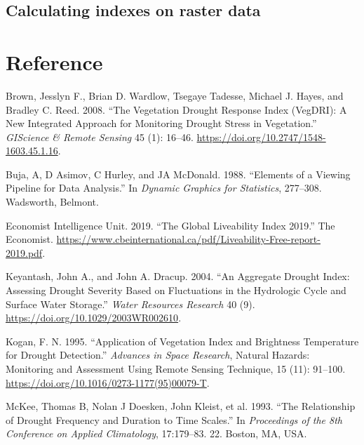 \documentclass[
]{article}
\newlength{\cslhangindent}
\newlength{\cslentryspacingunit} %
\newenvironment{CSLReferences}[2] %
 {%
  \setlength{\parindent}{0pt}
  \ifodd #1
  \let\oldpar\par
  \def\par{\hangindent=\cslhangindent\oldpar}
  \fi
  \setlength{\parskip}{#2\cslentryspacingunit}
 }%
 {}
\begin{document}
\newpage

\hypertarget{calculating-indexes-on-raster-data}{%
\subsection{Calculating indexes on raster
data}\label{calculating-indexes-on-raster-data}}

\hypertarget{reference}{%
\section*{Reference}\label{reference}}

\hypertarget{refs}{}
\begin{CSLReferences}{1}{0}
\leavevmode{}%
Brown, Jesslyn F., Brian D. Wardlow, Tsegaye Tadesse, Michael J. Hayes,
and Bradley C. Reed. 2008. {``The {Vegetation} {Drought} {Response}
{Index} ({VegDRI}): {A} {New} {Integrated} {Approach} for {Monitoring}
{Drought} {Stress} in {Vegetation}.''} \emph{GIScience \& Remote
Sensing} 45 (1): 16--46.
\url{https://doi.org/10.2747/1548-1603.45.1.16}.

\leavevmode{}%
Buja, A, D Asimov, C Hurley, and JA McDonald. 1988. {``Elements of a
Viewing Pipeline for Data Analysis.''} In \emph{Dynamic Graphics for
Statistics}, 277--308. Wadsworth, Belmont.

\leavevmode{}%
Economist Intelligence Unit. 2019. {``The Global Liveability Index
2019.''} The Economist.
\url{https://www.cbeinternational.ca/pdf/Liveability-Free-report-2019.pdf}.

\leavevmode{}%
Keyantash, John A., and John A. Dracup. 2004. {``An Aggregate Drought
Index: {Assessing} Drought Severity Based on Fluctuations in the
Hydrologic Cycle and Surface Water Storage.''} \emph{Water Resources
Research} 40 (9). \url{https://doi.org/10.1029/2003WR002610}.

\leavevmode{}%
Kogan, F. N. 1995. {``Application of Vegetation Index and Brightness
Temperature for Drought Detection.''} \emph{Advances in Space Research},
Natural {Hazards}: {Monitoring} and {Assessment} {Using} {Remote}
{Sensing} {Technique}, 15 (11): 91--100.
\url{https://doi.org/10.1016/0273-1177(95)00079-T}.

\leavevmode{}%
McKee, Thomas B, Nolan J Doesken, John Kleist, et al. 1993. {``The
Relationship of Drought Frequency and Duration to Time Scales.''} In
\emph{Proceedings of the 8th Conference on Applied Climatology},
17:179--83. 22. Boston, MA, USA.


\end{CSLReferences}
\end{document}
